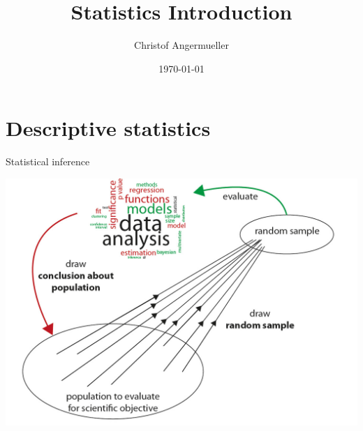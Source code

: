 \documentclass{beamer}\usepackage[]{graphicx}\usepackage[]{color}
\author{Christof Angermueller}
\title{Statistics Introduction}
\date{\today}
\begin{document}
\begin{frame}
  \titlepage
\end{frame}

\begin{frame}
  \tableofcontents
\end{frame}





\section{Descriptive statistics}
\begin{frame}
\tableofcontents[currentsection]
\end{frame}

\begin{frame}{Statistical inference}
  \begin{center}
    \includegraphics[width=.7\linewidth]{inference.jpg}
  \end{center}
\end{frame}
\end{document}
